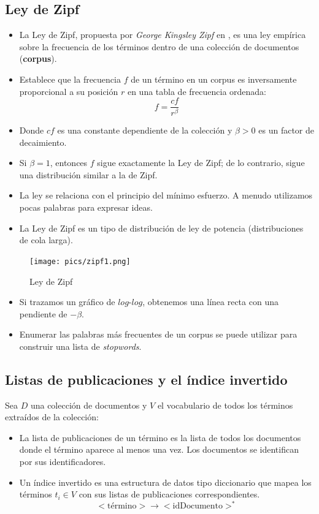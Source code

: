 \documentclass{book}
\begin{document}
\subsection{Ley de Zipf}
\begin{itemize}
   \item La Ley de Zipf, propuesta por \emph{George Kingsley Zipf} en \cite{zipf1935}, es una ley empírica sobre la frecuencia de los términos dentro de una colección de documentos (\textbf{corpus}).
   \item Establece que la frecuencia $f$ de un término en un corpus es inversamente proporcional a su posición $r$ en una tabla de frecuencia ordenada:
   \begin{equation}
      f = \frac{cf}{r^{\beta}}
   \end{equation}
   \item Donde $cf$ es una constante dependiente de la colección y $\beta > 0$ es un factor de decaimiento.
   \item Si $\beta = 1$, entonces $f$ sigue exactamente la Ley de Zipf; de lo contrario, sigue una distribución similar a la de Zipf.
   \item La ley se relaciona con el principio del mínimo esfuerzo. A menudo utilizamos pocas palabras para expresar ideas.
   \item La Ley de Zipf es un tipo de distribución de ley de potencia (distribuciones de cola larga).
\end{itemize}

\begin{figure}[h!]
	\centering
	\texttt{[image: pics/zipf1.png]}
	\caption{Ley de Zipf}
\end{figure}

\begin{itemize}
   \item Si trazamos un gráfico de $log$-$log$, obtenemos una línea recta con una pendiente de $-\beta$.
   \item Enumerar las palabras más frecuentes de un corpus se puede utilizar para construir una lista de \emph{stopwords}.
\end{itemize}
\subsection{Listas de publicaciones y el índice invertido}
Sea $D$ una colección de documentos y $V$ el vocabulario de todos los términos extraídos de la colección:

\begin{itemize}
\item La lista de publicaciones de un término es la lista de todos los documentos donde el término aparece al menos una vez. Los documentos se identifican por sus identificadores.
\item Un índice invertido es una estructura de datos tipo diccionario que mapea los términos $t_{i} \in V$ con sus listas de publicaciones correspondientes.
\begin{displaymath}
<\text{término}> \rightarrow <\text{idDocumento}>^*
\end{displaymath}
\end{itemize}
\end{document}
